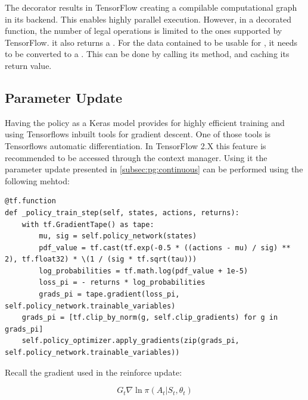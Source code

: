 \noindent
The  decorator results in TensorFlow creating a compilable computational graph in its backend. This enables highly parallel execution. However, in a  decorated function, the number of legal operations is limited to the ones supported by TensorFlow. it also returns a . For the data contained to be usable for , it needs to be converted to a . This can be done by calling its  method, and caching its return value. 

\subsection{Parameter Update}\label{subsec:ip:agent:training_func}
Having the policy as a Keras model provides for highly efficient training and using Tensorflows inbuilt tools for gradient descent. One of those tools is Tensorflows automatic differentiation. In TensorFlow 2.X this feature is recommended to be accessed through the  context manager. Using it the parameter update presented in \ref{subsec:pg:continuous} can be performed using the following mehtod:

\begin{lstlisting}[basicstyle=\footnotesize]
@tf.function
def _policy_train_step(self, states, actions, returns):
    with tf.GradientTape() as tape:
        mu, sig = self.policy_network(states)
        pdf_value = tf.cast(tf.exp(-0.5 * ((actions - mu) / sig) ** 2), tf.float32) * \(1 / (sig * tf.sqrt(tau)))
        log_probabilities = tf.math.log(pdf_value + 1e-5)
        loss_pi = - returns * log_probabilities
        grads_pi = tape.gradient(loss_pi, self.policy_network.trainable_variables)
    grads_pi = [tf.clip_by_norm(g, self.clip_gradients) for g in grads_pi]
    self.policy_optimizer.apply_gradients(zip(grads_pi, self.policy_network.trainable_variables))
\end{lstlisting}

\noindent
Recall the gradient used in the reinforce update:

\begin{equation*}
    G_t \nabla \ln{\pi(A_t | S_t, \theta_t)}
\end{equation*}


